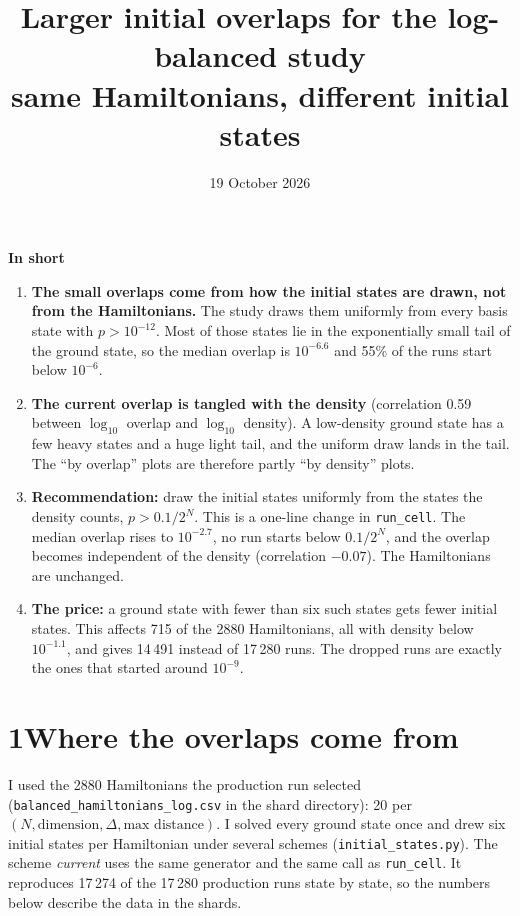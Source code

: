 \documentclass[10pt,a4paper]{article}
\title{\vspace{-1.2cm}Larger initial overlaps for the log-balanced study\\[2pt]
\large same Hamiltonians, different initial states}
\date{19 October 2026}
\author{}
\begin{document}
\maketitle
\vspace{-1.4cm}

\noindent\colorbox{boxbg}{\parbox{\dimexpr\linewidth-2\fboxsep}{%
\textbf{In short}
\begin{enumerate}[leftmargin=1.4em]
\item \textbf{The small overlaps come from how the initial states are drawn, not from the
  Hamiltonians.} The study draws them uniformly from every basis state with $p>10^{-12}$.
  Most of those states lie in the exponentially small tail of the ground state, so the
  median overlap is $10^{-6.6}$ and 55\% of the runs start below $10^{-6}$.
\item \textbf{The current overlap is tangled with the density} (correlation 0.59 between
  $\log_{10}$ overlap and $\log_{10}$ density). A low-density ground state has a few heavy
  states and a huge light tail, and the uniform draw lands in the tail. The ``by overlap''
  plots are therefore partly ``by density'' plots.
\item \textbf{Recommendation:} draw the initial states uniformly from the states the density
  counts, $p>0.1/2^N$. This is a one-line change in \texttt{run\_cell}. The median overlap
  rises to $10^{-2.7}$, no run starts below $0.1/2^N$, and the overlap becomes independent
  of the density (correlation $-0.07$). The Hamiltonians are unchanged.
\item \textbf{The price:} a ground state with fewer than six such states gets fewer initial
  states. This affects 715 of the 2880 Hamiltonians, all with density below $10^{-1.1}$, and
  gives 14\,491 instead of 17\,280 runs. The dropped runs are exactly the ones that started
  around $10^{-9}$.
\end{enumerate}}}

\section*{1\quad Where the overlaps come from}
I used the 2880 Hamiltonians the production run selected (\texttt{balanced\_hamiltonians\_log.csv}
in the shard directory): 20 per $(N,\text{dimension},\Delta,\text{max distance})$. I solved
every ground state once and drew six initial states per Hamiltonian under several schemes
(\texttt{initial\_states.py}). The scheme \emph{current} uses the same generator and the same
call as \texttt{run\_cell}. It reproduces 17\,274 of the 17\,280 production runs state by state,
so the numbers below describe the data in the shards.
\end{document}
